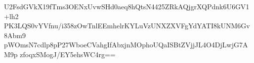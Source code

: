 U2FsdGVkX19fTms3OENxUvwSHd0aeq8hQtsN4425ZRkAQjgrXQPdnk6U6GV1+lh2
PK3LQS0vYVfnu/i358zOwTnlEEmhelrKYLuVzUNXZXVFgYdYATI8kUNM6Gv8Abm9
pWOmsN7cdlp8pP27WboeCVahgIfAbxjnMOphoUQaISBtZVjjJL4O4DjLwjG7AM9p
zfoqxSMogJ/EY5ehsWC4rg==
